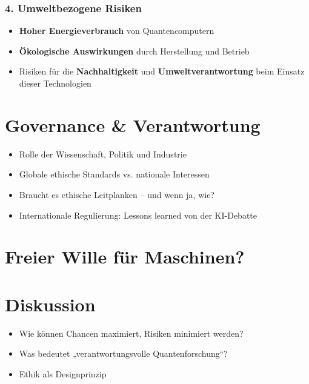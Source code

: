 \subsubsection{\textbf{4. Umweltbezogene Risiken}}
\begin{itemize}
    \item \textbf{Hoher Energieverbrauch} von Quantencomputern
    \item \textbf{Ökologische Auswirkungen} durch Herstellung und Betrieb
    \item Risiken für die \textbf{Nachhaltigkeit} und \textbf{Umweltverantwortung} beim Einsatz dieser Technologien
\end{itemize}

\cite{umbrello_quantum_2024}

\section{Governance \& Verantwortung}

\begin{itemize}
\item Rolle der Wissenschaft, Politik und Industrie
\item Globale ethische Standards vs. nationale Interessen
\item Braucht es ethische Leitplanken – und wenn ja, wie?
\item Internationale Regulierung: Lessons learned von der KI-Debatte
\end{itemize}

\section{Freier Wille für Maschinen?}



\section{Diskussion}

\begin{itemize}
\item Wie können Chancen maximiert, Risiken minimiert   werden?
\item Was bedeutet „verantwortungsvolle Quantenforschung“?
\item Ethik als Designprinzip
\end{itemize}

\printbibliography
